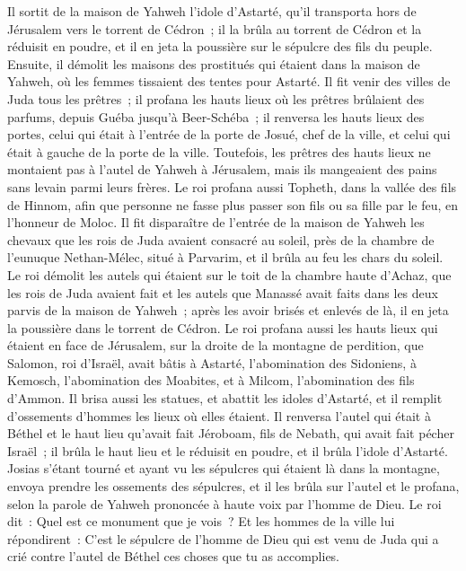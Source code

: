 \begin{multicols}{2}
Il sortit de la maison de Yahweh l'idole d'Astarté, qu'il transporta hors de Jérusalem vers le torrent de Cédron~; il la brûla au torrent de Cédron et la réduisit en poudre, et il en jeta la poussière sur le sépulcre des fils du peuple.
Ensuite, il démolit les maisons des prostitués qui étaient dans la maison de Yahweh, où les femmes tissaient des tentes pour Astarté.
Il fit venir des villes de Juda tous les prêtres~; il profana les hauts lieux où les prêtres brûlaient des parfums, depuis Guéba jusqu'à Beer-Schéba~; il renversa les hauts lieux des portes, celui qui était à l'entrée de la porte de Josué, chef de la ville, et celui qui était à gauche de la porte de la ville.
Toutefois, les prêtres des hauts lieux ne montaient pas à l'autel de Yahweh à Jérusalem, mais ils mangeaient des pains sans levain parmi leurs frères.
Le roi profana aussi Topheth, dans la vallée des fils de Hinnom, afin que personne ne fasse plus passer son fils ou sa fille par le feu, en l'honneur de Moloc.
Il fit disparaître de l'entrée de la maison de Yahweh les chevaux que les rois de Juda avaient consacré au soleil, près de la chambre de l'eunuque Nethan-Mélec, situé à Parvarim, et il brûla au feu les chars du soleil.
Le roi démolit les autels qui étaient sur le toit de la chambre haute d'Achaz, que les rois de Juda avaient fait et les autels que Manassé avait faits dans les deux parvis de la maison de Yahweh~; après les avoir brisés et enlevés de là, il en jeta la poussière dans le torrent de Cédron.
Le roi profana aussi les hauts lieux qui étaient en face de Jérusalem, sur la droite de la montagne de perdition, que Salomon, roi d'Israël, avait bâtis à Astarté, l'abomination des Sidoniens, à Kemosch, l'abomination des Moabites, et à Milcom, l'abomination des fils d'Ammon.
Il brisa aussi les statues, et abattit les idoles d'Astarté, et il remplit d'ossements d'hommes les lieux où elles étaient.
Il renversa l'autel qui était à Béthel et le haut lieu qu'avait fait Jéroboam, fils de Nebath, qui avait fait pécher Israël~; il brûla le haut lieu et le réduisit en poudre, et il brûla l'idole d'Astarté.
Josias s'étant tourné et ayant vu les sépulcres qui étaient là dans la montagne, envoya prendre les ossements des sépulcres, et il les brûla sur l'autel et le profana, selon la parole de Yahweh prononcée à haute voix par l'homme de Dieu.
Le roi dit~: Quel est ce monument que je vois~? Et les hommes de la ville lui répondirent~: C'est le sépulcre de l'homme de Dieu qui est venu de Juda qui a crié contre l'autel de Béthel ces choses que tu as accomplies.

\end{multicols}
